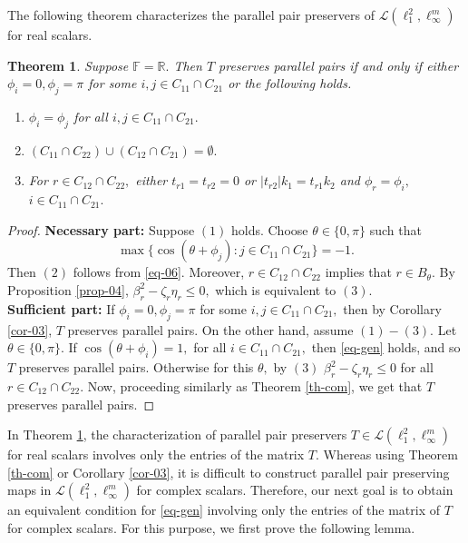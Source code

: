 \documentclass{amsart}
\newtheorem{theorem}{Theorem}[section]
\theoremstyle{definition}
\theoremstyle{remark}
\numberwithin{equation}{section}
\begin{document}
The following theorem characterizes the parallel pair preservers of $\mathcal{L}(\ell_1^2,\ell_\infty^m)$ for real scalars.
\begin{theorem}\label{th-comr}
	Suppose $\mathbb{F}=\mathbb{R}.$ Then $T$ preserves parallel pairs if and only if either $\phi_i=0,\phi_j=\pi$ for some $i,j\in C_{11}\cap C_{21}$ or the following holds.
	\begin{enumerate}
		\item $\phi_i=\phi_j$ for all  $i,j\in C_{11}\cap C_{21}.$
		\item  $(C_{11}\cap C_{22})\cup (C_{12}\cap C_{21})= \emptyset.$  
		\item For $r\in C_{12}\cap C_{22},$  either $t_{r1}=t_{r2}=0$ or $|t_{r2}|k_1=t_{r1}k_2$ and $\phi_r=\phi_i,$ $i\in  C_{11}\cap C_{21}.$
	\end{enumerate}
\end{theorem}
\begin{proof}
\textbf{Necessary part:} Suppose $(1)$ holds. %
Choose $\theta\in \{0,\pi\}$ such that $$\max\{\cos(\theta+\phi_j):j\in C_{11}\cap C_{21}\}=-1.$$ Then $(2)$ follows from \eqref{eq-06}. Moreover,  $r\in C_{12}\cap C_{22}$ implies that $r\in B_\theta.$ By Proposition \ref{prop-04}, $\beta_r^2-\zeta_r\eta_r\leq 0,$ which is equivalent to $(3).$\\
	\textbf{Sufficient part:} If $\phi_i=0,\phi_j=\pi$ for some $i,j\in C_{11}\cap C_{21},$ then by Corollary \ref{cor-03}, $T$ preserves parallel pairs. On the other hand, assume $(1)-(3).$  Let $\theta\in \{0,\pi\}.$ If $\cos(\theta+\phi_i)=1,$ for all $i\in C_{11}\cap C_{21},$ then \eqref{eq-gen} holds, and so $T$ preserves parallel pairs. Otherwise for this $\theta,$ by $(3)$  $\beta_r^2-\zeta_r\eta_r\leq 0$ for all $r\in C_{12}\cap C_{22}.$ Now, proceeding similarly as  Theorem \ref{th-com}, we get that $T$ preserves parallel pairs.
\end{proof}

In Theorem \ref{th-comr}, the characterization of parallel pair preservers $T\in \mathcal{L}(\ell_1^2,\ell_\infty^m)$ for real scalars involves only the entries of the matrix $T.$ Whereas using Theorem \ref{th-com} or Corollary \ref{cor-03}, it is difficult to construct parallel pair preserving maps in $\mathcal{L}(\ell_1^2,\ell_\infty^m)$ for complex scalars.
Therefore, our next goal is to obtain an equivalent condition for \eqref{eq-gen} involving only the entries of the matrix of $T$ for complex scalars. For this purpose, we first prove the following lemma. %
\end{document}
